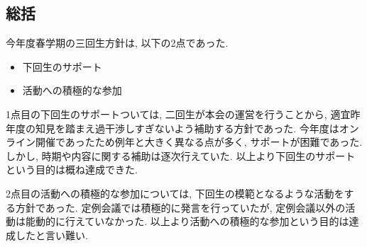 \subsection*{\thirdGrade{}総括}


今年度春学期の三回生方針は, 以下の2点であった.
\begin{itemize}
\item 下回生のサポート
\item 活動への積極的な参加
\end{itemize}
\par 1点目の下回生のサポートついては, 二回生が本会の運営を行うことから, 適宜昨年度の知見を踏まえ過干渉しすぎないよう補助する方針であった.
今年度はオンライン開催であったため例年と大きく異なる点が多く, サポートが困難であった. しかし, 時期や内容に関する補助は逐次行えていた. 以上より下回生のサポートという目的は概ね達成できた.
\par 2点目の活動への積極的な参加については, 下回生の模範となるような活動をする方針であった.
定例会議では積極的に発言を行っていたが, 定例会議以外の活動は能動的に行えていなかった. 以上より活動への積極的な参加という目的は達成したと言い難い.
